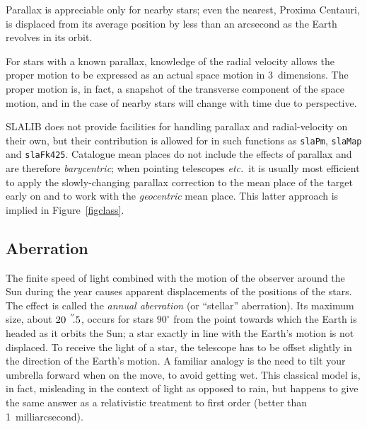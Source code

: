 \documentclass[11pt,fleqn,twoside]{article}
\renewcommand{\_}{{\tt\char'137}}     %
\newcommand{\arcseci}[1] {$#1\hspace{0.05em}$\raisebox{-0.5ex}
                         {$^{'\hspace{-0.1em}'\hspace{0.0em}}$}}
\newcommand{\arcsec}[2] {\arcseci{#1}$\hspace{-0.35em}.#2$}
\begin{document}
Parallax is appreciable only for nearby stars;  even
the nearest, Proxima Centauri, is displaced from its average
position by less than
an arcsecond as the Earth revolves in its orbit.
 
For stars with a known parallax, knowledge of the radial velocity
allows the proper motion to be expressed as an actual space
motion in 3~dimensions.  The proper motion is,
in fact, a snapshot of the transverse component of the
space motion, and in the case of nearby stars will
change with time due to perspective.
 
SLALIB does not provide facilities for handling parallax
and radial-velocity on their own, but their contribution is
allowed for in such functions as
{\tt slaPm},
{\tt slaMap}
and
{\tt slaFk425}.
Catalogue mean
places do not include the effects of parallax and are therefore
{\it barycentric};  when pointing telescopes {\it etc.}\ it is
usually most efficient to apply the slowly-changing
parallax correction to the mean place of the target early on
and to work with the {\it geocentric}\/ mean place.  This latter
approach is implied in Figure~\ref{figclass}.

\subsection{Aberration}
The finite speed of light combined with the motion of the observer
around the Sun during the year causes apparent displacements of
the positions of the stars.  The effect is called
the {\it annual aberration} (or ``stellar''
aberration).  Its maximum size, about \arcsec{20}{5},
occurs for stars $90^{\circ}$ from the point towards which
the Earth is headed as it orbits the Sun;  a star exactly in line with
the Earth's motion is not displaced.  To receive the light of
a star, the telescope has to be offset slightly in the direction of
the Earth's motion.  A familiar analogy is the need to tilt your
umbrella forward when on the move, to avoid getting wet.  This
classical model is,
in fact, misleading in the context of light as opposed
to rain, but happens to give the same answer as a relativistic
treatment to first order (better than 1~milliarcsecond).
\end{document}
